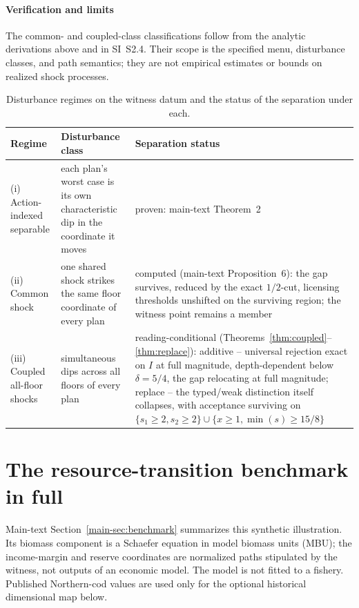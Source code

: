 \documentclass[preprint,11pt,authoryear]{elsarticle}
\theoremstyle{remark}
\begin{document}
\paragraph{Verification and limits} The common- and coupled-class classifications follow from the analytic derivations above and in SI~S2.4. Their scope is the specified menu, disturbance classes, and path semantics; they are not empirical estimates or bounds on realized shock processes.

\begin{table}[!htbp]
\centering\small
\caption{Disturbance regimes on the witness datum and the status of the separation under each.}
\label{tab:disturbance}
\begin{tabularx}{\textwidth}{@{}>{\raggedright\arraybackslash}p{}>{\raggedright\arraybackslash}p{}X@{}}
\toprule
Regime & Disturbance class & Separation status \\
\midrule
(i) Action-indexed separable & each plan's worst case is its own characteristic dip in the coordinate it moves & proven: main-text Theorem~2 \\
(ii) Common shock & one shared shock strikes the same floor coordinate of every plan & computed (main-text Proposition~6): the gap survives, reduced by the exact $1/2$-cut, licensing thresholds unshifted on the surviving region; the witness point remains a member \\
(iii) Coupled all-floor shocks & simultaneous dips across all floors of every plan & reading-conditional (Theorems~\ref{thm:coupled}--\ref{thm:replace}): additive -- universal rejection exact on $I$ at full magnitude, depth-dependent below $\delta=5/4$, the gap relocating at full magnitude; replace -- the typed/weak distinction itself collapses, with acceptance surviving on $\{s_1\ge2,s_2\ge2\}\cup\{x\ge1,\min(s)\ge15/8\}$ \\
\bottomrule
\end{tabularx}
\end{table}

\section{The resource-transition benchmark in full}\label{si:benchmark}

Main-text Section~\ref{main-sec:benchmark} summarizes this synthetic illustration. Its biomass component is a Schaefer equation in model biomass units (MBU); the income-margin and reserve coordinates are normalized paths stipulated by the witness, not outputs of an economic model. The model is not fitted to a fishery. Published Northern-cod values are used only for the optional historical dimensional map below.
\end{document}
